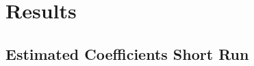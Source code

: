 \documentclass[12pt,letterpaper]{article}
\begin{document}


\section{Results}
\label{sec:results}


\subsection{Estimated Coefficients Short Run}

\end{document}
